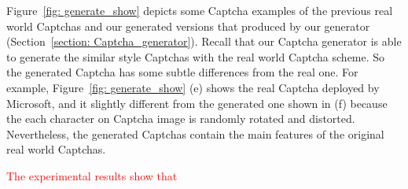 Figure~\ref{fig: generate_show} depicts some Captcha examples of the previous real world Captchas and our generated versions that produced by our generator (Section~\ref{section: Captcha_generator}). Recall that our Captcha generator is able to generate the similar style Captchas with the real world Captcha scheme. So the generated Captcha has some subtle differences from the real one. For example, Figure~\ref{fig: generate_show} (e) shows the real Captcha deployed by Microsoft, and it slightly different from the generated one shown in (f) because the each character on Captcha image is randomly rotated and distorted.
Nevertheless, the generated Captchas contain the main features of the original real world Captchas.

\textcolor{red}{The experimental results show that}

\begin{figure}
  \centering
\end{figure}
